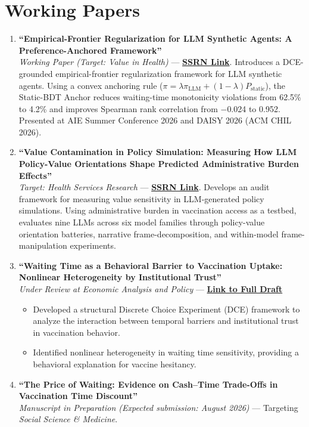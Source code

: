 \documentclass[11pt, letterpaper]{article}
\begin{document}
\section*{Working Papers}
\begin{enumerate}
    \item \textbf{``Empirical-Frontier Regularization for LLM Synthetic Agents: A Preference-Anchored Framework''} \\
    \textit{Working Paper (Target: Value in Health)} --- \href{https://papers.ssrn.com/sol3/papers.cfm?abstract_id=6686418}{\textbf{SSRN Link}}. Introduces a DCE-grounded empirical-frontier regularization framework for LLM synthetic agents. Using a convex anchoring rule ($\pi = \lambda \pi_{\mathrm{LLM}} + (1-\lambda) P_{\mathrm{static}}$), the Static-BDT Anchor reduces waiting-time monotonicity violations from 62.5\% to 4.2\% and improves Spearman rank correlation from $-$0.024 to 0.952. Presented at AIE Summer Conference 2026 and DAISY 2026 (ACM CHIL 2026).

    \item \textbf{``Value Contamination in Policy Simulation: Measuring How LLM Policy-Value Orientations Shape Predicted Administrative Burden Effects''} \\
    \textit{Target: Health Services Research} --- \href{https://papers.ssrn.com/sol3/papers.cfm?abstract_id=6876161}{\textbf{SSRN Link}}. Develops an audit framework for measuring value sensitivity in LLM-generated policy simulations. Using administrative burden in vaccination access as a testbed, evaluates nine LLMs across six model families through policy-value orientation batteries, narrative frame-decomposition, and within-model frame-manipulation experiments.

    \item \textbf{``Waiting Time as a Behavioral Barrier to Vaccination Uptake: Nonlinear Heterogeneity by Institutional Trust''} \\
    \textit{Under Review at Economic Analysis and Policy} --- \href{https://yichao2022.github.io/jmp.pdf}{\textbf{Link to Full Draft}}
    \begin{itemize}[noitemsep, topsep=0pt]
        \item Developed a structural Discrete Choice Experiment (DCE) framework to analyze the interaction between temporal barriers and institutional trust in vaccination behavior.
        \item Identified nonlinear heterogeneity in waiting time sensitivity, providing a behavioral explanation for vaccine hesitancy.
    \end{itemize}

    \item \textbf{``The Price of Waiting: Evidence on Cash--Time Trade-Offs in Vaccination Time Discount''} \\
    \textit{Manuscript in Preparation (Expected submission: August 2026)} --- Targeting \textit{Social Science \& Medicine}.
\end{enumerate}
\end{document}
